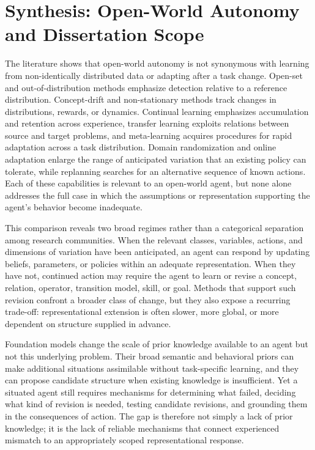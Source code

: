 
\section{Synthesis: Open-World Autonomy and Dissertation Scope}
\label{sec:synthesis_positioning}
\label{sec:ow_gaps}
\label{sec:positioning}
\label{sec:open_world_landscape}
\label{sec:related_work_positioning}
\label{sec:perspectives_integration}
\label{sec:ch3_positioning_summary}

The literature shows that open-world autonomy is not synonymous with learning from non-identically distributed data or adapting after a task change.
Open-set and out-of-distribution methods emphasize detection relative to a reference distribution.
Concept-drift and non-stationary methods track changes in distributions, rewards, or dynamics.
Continual learning emphasizes accumulation and retention across experience, transfer learning exploits relations between source and target problems, and meta-learning acquires procedures for rapid adaptation across a task distribution.
Domain randomization and online adaptation enlarge the range of anticipated variation that an existing policy can tolerate, while replanning searches for an alternative sequence of known actions.
Each of these capabilities is relevant to an open-world agent, but none alone addresses the full case in which the assumptions or representation supporting the agent's behavior become inadequate.

This comparison reveals two broad regimes rather than a categorical separation among research communities.
When the relevant classes, variables, actions, and dimensions of variation have been anticipated, an agent can respond by updating beliefs, parameters, or policies within an adequate representation.
When they have not, continued action may require the agent to learn or revise a concept, relation, operator, transition model, skill, or goal.
Methods that support such revision confront a broader class of change, but they also expose a recurring trade-off: representational extension is often slower, more global, or more dependent on structure supplied in advance.

Foundation models change the scale of prior knowledge available to an agent but not this underlying problem.
Their broad semantic and behavioral priors can make additional situations assimilable without task-specific learning, and they can propose candidate structure when existing knowledge is insufficient.
Yet a situated agent still requires mechanisms for determining what failed, deciding what kind of revision is needed, testing candidate revisions, and grounding them in the consequences of action.
The gap is therefore not simply a lack of prior knowledge; it is the lack of reliable mechanisms that connect experienced mismatch to an appropriately scoped representational response.

